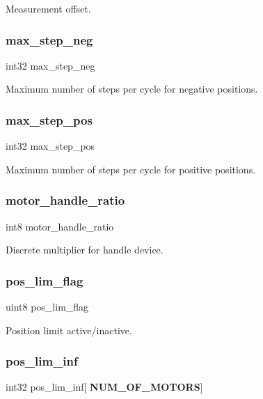 Measurement offset. \mbox{\label{structst__mem_a14fe3ed96d232dced2d33efc493a0667}} 
\subsubsection{max\+\_\+step\+\_\+neg}
{\footnotesize\ttfamily int32 max\+\_\+step\+\_\+neg}

Maximum number of steps per cycle for negative positions. \mbox{\label{structst__mem_a9be5987152b8c6bb28c1d311bc94e5e3}} 
\subsubsection{max\+\_\+step\+\_\+pos}
{\footnotesize\ttfamily int32 max\+\_\+step\+\_\+pos}

Maximum number of steps per cycle for positive positions. \mbox{\label{structst__mem_a098badbb74d31ea6257e57f6d66823cc}} 
\subsubsection{motor\+\_\+handle\+\_\+ratio}
{\footnotesize\ttfamily int8 motor\+\_\+handle\+\_\+ratio}

Discrete multiplier for handle device. \mbox{\label{structst__mem_aa2ceebf7546e978c8b0393ce8035532d}} 
\subsubsection{pos\+\_\+lim\+\_\+flag}
{\footnotesize\ttfamily uint8 pos\+\_\+lim\+\_\+flag}

Position limit active/inactive. \mbox{\label{structst__mem_a631265c712a620e03d9233634e1819a2}} 
\subsubsection{pos\+\_\+lim\+\_\+inf}
{\footnotesize\ttfamily int32 pos\+\_\+lim\+\_\+inf[\textbf{ N\+U\+M\+\_\+\+O\+F\+\_\+\+M\+O\+T\+O\+RS}]}

